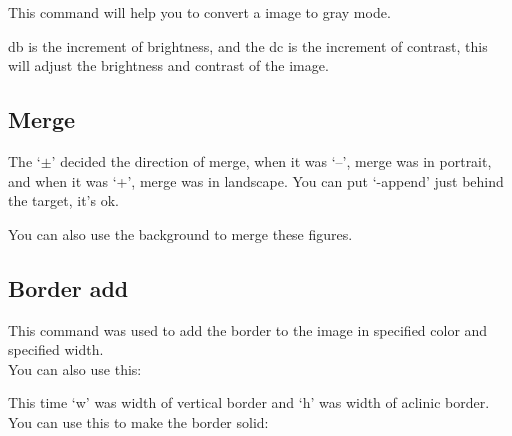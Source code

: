 \documentclass[12pt]{article}
\begin{document}
This command will help you to convert a image to gray mode.\vspace{5mm}

{\centering{}\par}\vspace{5mm}

db is the increment of brightness, and the dc is the increment of contrast, this will adjust the brightness and contrast of the image.
\subsection{Merge}
{\centering{}\par}\vspace{5mm}

The `$\pm$' decided the direction of merge, when it was `\---', merge was in portrait, and when it was `+', merge was in landscape. You can put `-append' just behind the target, it's ok.

You can also use the background to merge these figures.

\subsection{Border add}
{\centering{}\par}\vspace{5mm}

This command was used to add the border to the image in specified color and specified width.\\

You can also use this:\vspace{5mm}

{\centering{}\par}\vspace{5mm}

This time `w' was width of vertical border and `h' was width of aclinic border.\\

You can use this to make the border solid:\vspace{5mm}

{\centering{}\par}\vspace{5mm}
\end{document}
